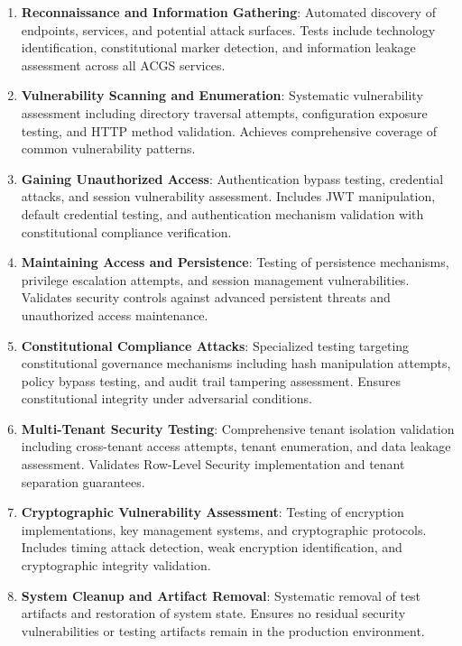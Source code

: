 \documentclass[manuscript,screen,9pt]{acmart}
\begin{document}
\begin{enumerate}[leftmargin=*,itemsep=2pt,parsep=1pt]
    \item \textbf{Reconnaissance and Information Gathering}: Automated discovery of endpoints, services, and potential attack surfaces. Tests include technology identification, constitutional marker detection, and information leakage assessment across all ACGS services.

    \item \textbf{Vulnerability Scanning and Enumeration}: Systematic vulnerability assessment including directory traversal attempts, configuration exposure testing, and HTTP method validation. Achieves comprehensive coverage of common vulnerability patterns.

    \item \textbf{Gaining Unauthorized Access}: Authentication bypass testing, credential attacks, and session vulnerability assessment. Includes JWT manipulation, default credential testing, and authentication mechanism validation with constitutional compliance verification.

    \item \textbf{Maintaining Access and Persistence}: Testing of persistence mechanisms, privilege escalation attempts, and session management vulnerabilities. Validates security controls against advanced persistent threats and unauthorized access maintenance.

    \item \textbf{Constitutional Compliance Attacks}: Specialized testing targeting constitutional governance mechanisms including hash manipulation attempts, policy bypass testing, and audit trail tampering assessment. Ensures constitutional integrity under adversarial conditions.

    \item \textbf{Multi-Tenant Security Testing}: Comprehensive tenant isolation validation including cross-tenant access attempts, tenant enumeration, and data leakage assessment. Validates Row-Level Security implementation and tenant separation guarantees.

    \item \textbf{Cryptographic Vulnerability Assessment}: Testing of encryption implementations, key management systems, and cryptographic protocols. Includes timing attack detection, weak encryption identification, and cryptographic integrity validation.

    \item \textbf{System Cleanup and Artifact Removal}: Systematic removal of test artifacts and restoration of system state. Ensures no residual security vulnerabilities or testing artifacts remain in the production environment.
\end{enumerate}
\end{document}
